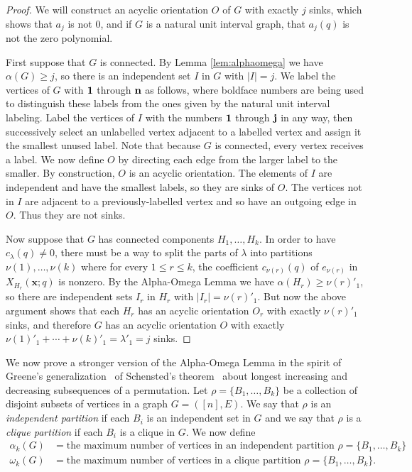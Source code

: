\documentclass[12pt]{amsart}  %
\theoremstyle{definition}
\theoremstyle{remark}
\numberwithin{equation}{section}
\begin{document}
\begin{proof}
We will construct an acyclic orientation $O$ of $G$ with exactly $j$ sinks, which shows that $a_j$ is not $0$, and if $G$ is a natural unit interval graph, that $a_j(q)$ is not the zero polynomial.

First suppose that $G$ is connected. By Lemma \ref{lem:alphaomega} we have $\alpha(G)\geq j$, so there is an independent set $I$ in $G$ with $|I|=j$. 
We label the vertices of $G$ 
with $\bf 1$ through $\bf n$ as follows, where boldface numbers are being used to distinguish these labels from the ones given by the natural unit interval labeling. Label the vertices of $I$ with the numbers $\bf 1$ through $\bf j$ in any way, then successively select an unlabelled vertex adjacent to a labelled vertex and assign it the smallest unused label. Note that because $G$ is connected, every vertex receives a label. We now define $O$ by directing each edge from the larger label to the smaller. By construction, $O$ is an acyclic orientation.
The elements of $I$ are independent and have the smallest labels, 
so they are sinks of $O$. The vertices not in $I$ are adjacent to a previously-labelled vertex and so have an outgoing edge in $O$.  Thus they are not sinks.

Now suppose that $G$ has connected components $H_1,\ldots,H_k$. In order to have $c_\lambda(q)\neq 0$, there must be a way to split the parts of $\lambda$ into partitions $\nu(1),\ldots,\nu(k)$ where for every $1\leq r\leq k$, the coefficient $c_{\nu(r)}(q)$ of $e_{\nu(r)}$ in $X_{H_r}(\bm x;q)$ is nonzero. By the Alpha-Omega Lemma we have $\alpha(H_r)\geq\nu(r)'_1$, so there are independent sets $I_r$ in $H_r$ with $|I_r|=\nu(r)'_1$. But now the above argument shows that each $H_r$ has an acyclic orientation $O_r$ with exactly $\nu(r)'_1$ sinks, and therefore $G$ has an acyclic orientation $O$ with exactly $\nu(1)'_1+\cdots+\nu(k)'_1=\lambda'_1=j$ sinks.
\end{proof}


We now prove a stronger version of the Alpha-Omega Lemma
in the spirit of Greene's generalization~\cite{gre:est} of Schensted's theorem~\cite{sch:lid} about longest increasing and decreasing subsequences of a permutation. Let $\rho=\{B_1,\ldots,B_k\}$ be a collection of disjoint subsets of vertices in a graph $G=([n],E)$. We say that $\rho$ is an \emph{independent partition} if each $B_i$ is an independent set in $G$ and we say that $\rho$ is a \emph{clique partition} if each $B_i$ is a clique in $G$. We now define
\begin{align*}
\alpha_k(G)&=\text{the maximum number of vertices in an independent partition }\rho=\{B_1,\ldots,B_k\}\\
\omega_k(G)&=\text{the maximum number of vertices in a clique partition }\rho=\{B_1,\ldots,B_k\}.
\end{align*}
\end{document}
